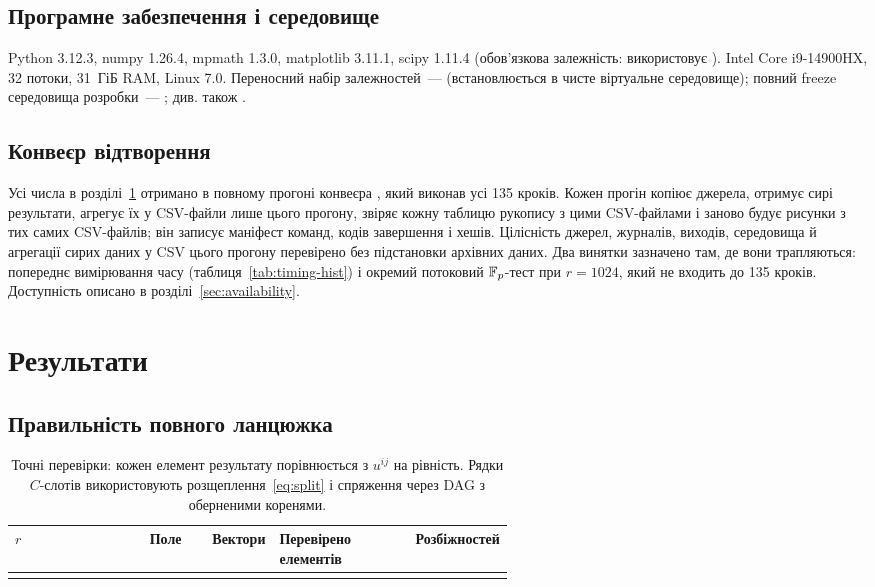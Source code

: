 \documentclass[11pt]{article}
\theoremstyle{plain}
\begin{document}
\subsection{Програмне забезпечення і середовище}\label{sec:env}
Python 3.12.3, numpy 1.26.4, mpmath 1.3.0, matplotlib 3.11.1, scipy 1.11.4 (обов'язкова залежність:  використовує ). Intel Core i9-14900HX, 32 потоки, 31~ГіБ RAM, Linux 7.0. Переносний набір залежностей~---  (встановлюється в чисте віртуальне середовище); повний freeze середовища розробки~--- ; див. також .

\subsection{Конвеєр відтворення}\label{sec:pipeline}
Усі числа в розділі~\ref{sec:results} отримано в повному прогоні  конвеєра , який виконав усі 135 кроків. Кожен прогін копіює джерела, отримує сирі результати, агрегує їх у CSV-файли лише цього прогону, звіряє кожну таблицю рукопису з цими CSV-файлами і заново будує рисунки з тих самих CSV-файлів; він записує маніфест команд, кодів завершення і хешів. Цілісність джерел, журналів, виходів, середовища й агрегації сирих даних у CSV цього прогону перевірено без підстановки архівних даних. Два винятки зазначено там, де вони трапляються: попереднє вимірювання часу (таблиця~\ref{tab:timing-hist}) і окремий потоковий $\mathbb{F}_p$-тест при $r=1024$, який не входить до 135 кроків. Доступність описано в розділі~\ref{sec:availability}.

\section{Результати}\label{sec:results}

\subsection{Правильність повного ланцюжка}\label{sec:res-correct}

\begin{table}[tb]
\centering\small
\caption{Точні перевірки: кожен елемент результату порівнюється з $u^{ij}$ на рівність. Рядки $C$-слотів використовують розщеплення~\eqref{eq:split} і спряження через DAG з оберненими коренями.}\label{tab:exact}
\begin{tabularx}{\linewidth}{@{}P{0.27\linewidth}LP{0.11\linewidth}P{0.2\linewidth}r@{}}
\toprule
$r$ & Поле & Вектори & Перевірено елементів & Розбіжностей \\
\midrule
{}
\bottomrule
\end{tabularx}
\end{table}
\end{document}
